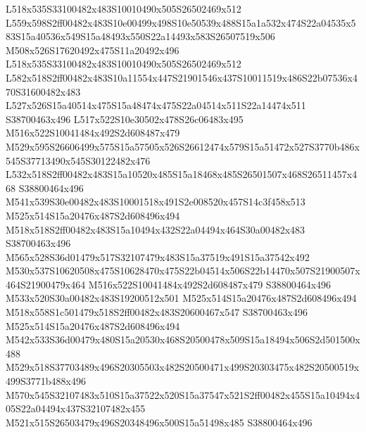 \documentclass{article}
\begin{document}
\begin{multicols}{2}
L518x535S33100482x483S10010490x505S26502469x512 L559x598S2ff00482x483S10e00499x498S10e50539x488S15a1a532x474S22a04535x583S15a40536x549S15a48493x550S22a14493x583S26507519x506 M508x526S17620492x475S11a20492x496 L518x535S33100482x483S10010490x505S26502469x512 L582x518S2ff00482x483S10a11554x447S21901546x437S10011519x486S22b07536x470S31600482x483 L527x526S15a40514x475S15a48474x475S22a04514x511S22a14474x511 S38700463x496 L517x522S10e30502x478S26c06483x495 M516x522S10041484x492S2d608487x479 M529x595S26606499x575S15a57505x526S26612474x579S15a51472x527S3770b486x545S37713490x545S30122482x476 L532x518S2ff00482x483S15a10520x485S15a18468x485S26501507x468S26511457x468 S38800464x496 M541x539S30e00482x483S10001518x491S2e008520x457S14c3f458x513 M525x514S15a20476x487S2d608496x494 M518x518S2ff00482x483S15a10494x432S22a04494x464S30a00482x483 S38700463x496 M565x528S36d01479x517S32107479x483S15a37519x491S15a37542x492 M530x537S10620508x475S10628470x475S22b04514x506S22b14470x507S21900507x464S21900479x464 M516x522S10041484x492S2d608487x479 S38800464x496 M533x520S30a00482x483S19200512x501 M525x514S15a20476x487S2d608496x494 M518x558S1c501479x518S2ff00482x483S20600467x547 S38700463x496 M525x514S15a20476x487S2d608496x494 M542x533S36d00479x480S15a20530x468S20500478x509S15a18494x506S2d501500x488 M529x518S37703489x496S20305503x482S20500471x499S20303475x482S20500519x499S3771b488x496 M570x545S32107483x510S15a37522x520S15a37547x521S2ff00482x455S15a10494x405S22a04494x437S32107482x455 M521x515S26503479x496S20348496x500S15a51498x485 S38800464x496





\end{multicols}
\end{document}
